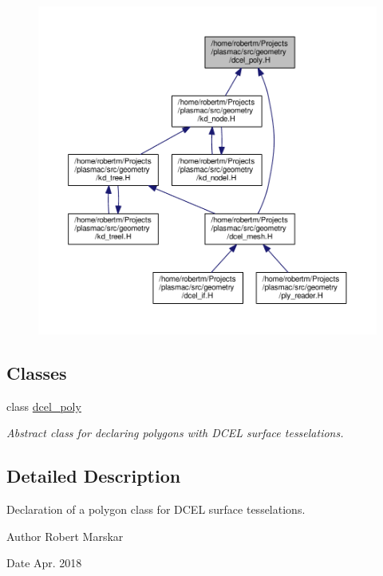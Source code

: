 \begin{figure}[H]
\begin{center}
\leavevmode
\includegraphics[width=350pt]{dcel__poly_8H__dep__incl}
\end{center}
\end{figure}
\subsection*{Classes}
\begin{DoxyCompactItemize}
\item 
class \hyperlink{classdcel__poly}{dcel\+\_\+poly}
\begin{DoxyCompactList}\small\item\em Abstract class for declaring polygons with D\+C\+EL surface tesselations. \end{DoxyCompactList}\end{DoxyCompactItemize}


\subsection{Detailed Description}
Declaration of a polygon class for D\+C\+EL surface tesselations. 

\begin{DoxyAuthor}{Author}
Robert Marskar 
\end{DoxyAuthor}
\begin{DoxyDate}{Date}
Apr. 2018 
\end{DoxyDate}
